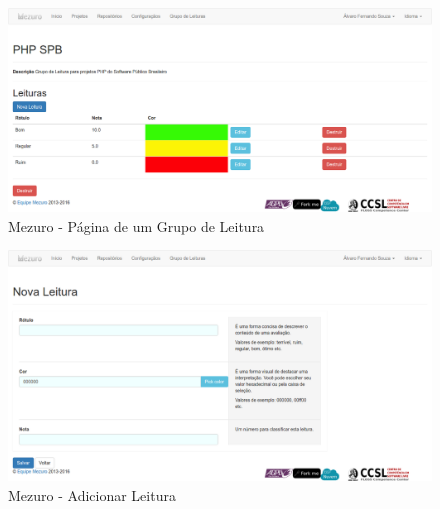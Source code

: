 \newpage

\begin{figure}[!htb]
	\centering
    \includegraphics[keepaspectratio=true,scale=0.3]
    {figuras/mezuro-leitura-view.eps}
  \caption{Mezuro - Página de um Grupo de Leitura}
	\label{fig:mezuro-leitura-view}
\end{figure}

\begin{figure}[!htb]
	\centering
    \includegraphics[keepaspectratio=true,scale=0.3]
    {figuras/mezuro-leitura-add.eps}
  \caption{Mezuro - Adicionar Leitura}
	\label{fig:mezuro-leitura-add}
\end{figure}

\newpage

